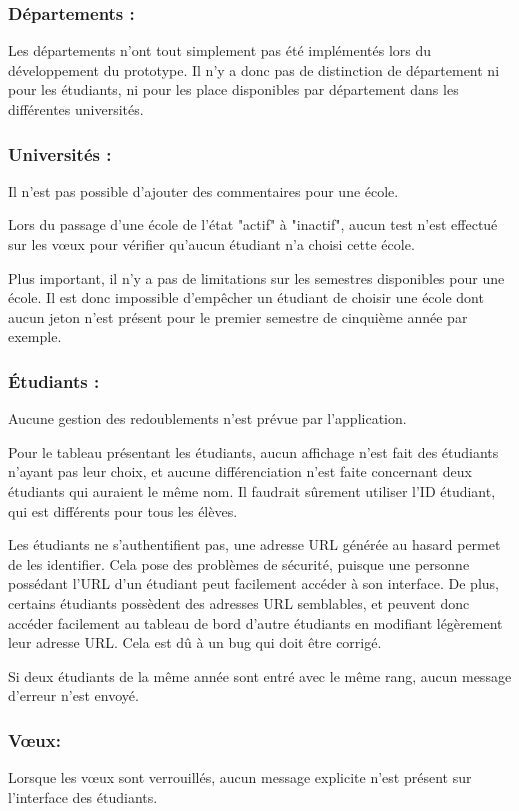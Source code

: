 \subsubsection{Départements :}
Les départements n'ont tout simplement pas été implémentés lors du développement du prototype. Il n'y a donc pas de distinction de département ni pour les étudiants, ni pour les place disponibles par département dans les différentes universités.


\subsubsection{Universités :}
Il n'est pas possible d'ajouter des commentaires pour une école.

Lors du passage d'une école de l'état "actif" à "inactif", aucun test n'est effectué sur les vœux pour vérifier qu'aucun étudiant n'a choisi cette école.

Plus important, il n'y a pas de limitations sur les semestres disponibles pour une école. Il est donc impossible d'empêcher un étudiant de choisir une école dont aucun jeton n'est présent pour le premier semestre de cinquième année par exemple.


\subsubsection{Étudiants :}
Aucune gestion des redoublements n'est prévue par l'application.

Pour le tableau présentant les étudiants, aucun affichage n'est fait des étudiants n'ayant pas leur choix, et aucune différenciation n'est faite concernant deux étudiants qui auraient le même nom. Il faudrait sûrement utiliser l'ID étudiant, qui est différents pour tous les élèves.

Les étudiants ne s'authentifient pas, une adresse URL générée au hasard permet de les identifier. Cela pose des problèmes de sécurité, puisque une personne possédant l'URL d'un étudiant peut facilement accéder à son interface. De plus, certains étudiants possèdent des adresses URL semblables, et peuvent donc accéder facilement au tableau de bord d'autre étudiants en modifiant légèrement leur adresse URL. Cela est dû à un bug qui doit être corrigé.

Si deux étudiants de la même année sont entré avec le même rang, aucun message d'erreur n'est envoyé.


\subsubsection{Vœux:}
Lorsque les vœux sont verrouillés, aucun message explicite n'est présent sur l'interface des étudiants.

